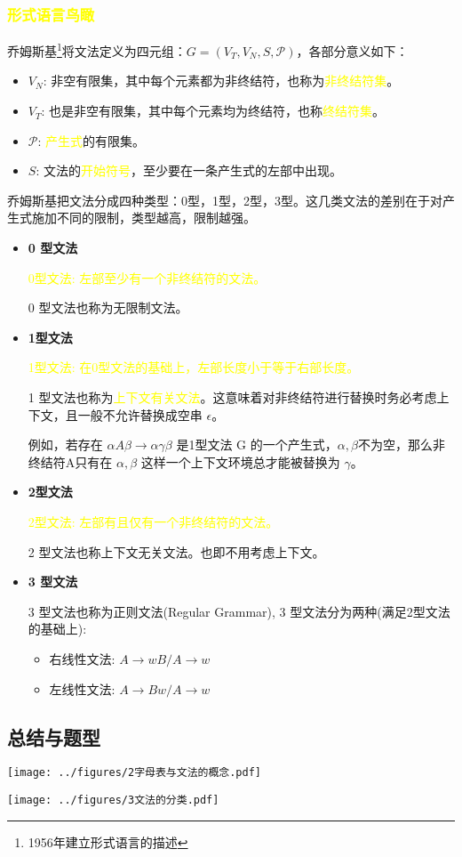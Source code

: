 \subsubsection{\textcolor{mark}{形式语言鸟瞰}}

乔姆斯基\footnote{1956年建立形式语言的描述}将文法定义为四元组：$G=(V_T,V_N,S,\mathcal{P})$，各部分意义如下：
\begin{itemize}
    \item $V_N$: 非空有限集，其中每个元素都为非终结符，也称为\textcolor{mark}{非终结符集}。
    \item $V_T$: 也是非空有限集，其中每个元素均为终结符，也称\textcolor{mark}{终结符集}。
    \item $\mathcal{P}$: \textcolor{mark}{产生式}的有限集。
    \item $S$: 文法的\textcolor{mark}{开始符号}，至少要在一条产生式的左部中出现。
\end{itemize}

乔姆斯基把文法分成四种类型：0型，1型，2型，3型。这几类文法的差别在于对产生式施加不同的限制，类型越高，限制越强。


\begin{itemize}
    \item \textbf{0 型文法}

          \textcolor{mark}{0型文法: 左部至少有一个非终结符的文法。}

          0 型文法也称为无限制文法。



    \item \textbf{1型文法}

          \textcolor{mark}{1型文法: 在0型文法的基础上，左部长度小于等于右部长度。}

          1 型文法也称为\textcolor{mark}{上下文有关文法}。这意味着对非终结符进行替换时务必考虑上下文，且一般不允许替换成空串 $\epsilon$。

          例如，若存在 $\alpha A \beta \rightarrow \alpha \gamma \beta$ 是1型文法 G 的一个产生式，$\alpha,\beta$不为空，那么非终结符A只有在 $\alpha,\beta$ 这样一个上下文环境总才能被替换为 $\gamma$。

    \item \textbf{2型文法}

          \textcolor{mark}{2型文法: 左部有且仅有一个非终结符的文法。}

          2 型文法也称\textcolor{imp}{上下文无关文法}。也即不用考虑上下文。

    \item \textbf{3 型文法}

          3 型文法也称为正则文法(Regular Grammar), 3 型文法分为两种(满足2型文法的基础上):
          \begin{itemize}
              \item 右线性文法: $A \rightarrow wB / A \rightarrow w$
              \item 左线性文法: $A \rightarrow Bw / A \rightarrow w$
          \end{itemize}
\end{itemize}

\subsection{总结与题型}

\texttt{[image: ../figures/2字母表与文法的概念.pdf]}


\texttt{[image: ../figures/3文法的分类.pdf]}

\newpage